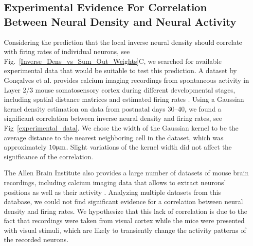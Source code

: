 \documentclass[10pt,letterpaper]{article}
\begin{document}
\subsection*{Experimental Evidence For Correlation Between Neural Density and Neural Activity}

Considering the prediction that the local inverse neural density should correlate with firing rates of individual neurons, see Fig.~\ref{Inverse_Dens_vs_Sum_Out_Weights}C, we searched for available experimental data that would be suitable to test this prediction.  A dataset by Gonçalves et al. provides calcium imaging recordings from spontaneous activity in Layer 2/3 mouse somatosensory cortex during different developmental stages, including spatial distance matrices and estimated firing rates \cite{Goncalves_2013,Goncalves_2017}. Using a Gaussian kernel density estimation on data from postnatal days 30--40, we found a significant correlation between inverse neural density and firing rates, see Fig~\ref{experimental_data}. We chose the width of the Gaussian kernel to be the average distance to the nearest neighboring cell in the dataset, which was approximately $\rm 10 \upmu m$. Slight variations of the kernel width did not affect the significance of the correlation.

The Allen Brain Institute also provides a large number of datasets of mouse brain recordings, including calcium imaging data that allows to extract neurons' positions as well as their activity \cite{AllenBrain}. Analyzing multiple datasets from this database, we could not find significant evidence for a correlation between neural density and firing rates. We hypothesize that this lack of correlation is due to the fact that recordings were taken from visual cortex while the mice were presented with visual stimuli, which are likely to transiently change the activity patterns of the recorded neurons.
\end{document}

